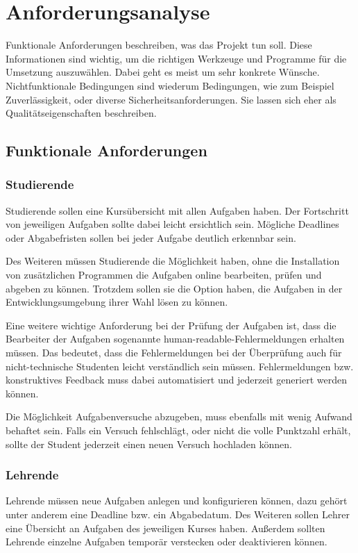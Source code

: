 \section{Anforderungsanalyse}\label{anforderungsanalyse}
Funktionale Anforderungen beschreiben, was das Projekt tun soll. Diese
Informationen sind wichtig, um die richtigen Werkzeuge und Programme für die
Umsetzung auszuwählen. Dabei geht es meist um sehr konkrete Wünsche.
Nichtfunktionale Bedingungen sind wiederum Bedingungen, wie zum Beispiel
Zuverlässigkeit, oder diverse Sicherheitsanforderungen. Sie lassen sich eher als
Qualitätseigenschaften beschreiben.

\subsection{Funktionale Anforderungen}\label{anforderungsanalyse-funktional}
\subsubsection{Studierende}\label{anforderungsanalyse-funktional-stud}
Studierende sollen eine Kursübersicht mit allen Aufgaben haben. Der Fortschritt
von jeweiligen Aufgaben sollte dabei leicht ersichtlich sein. Mögliche Deadlines
oder Abgabefristen sollen bei jeder Aufgabe deutlich erkennbar sein.

Des Weiteren müssen Studierende die Möglichkeit haben, ohne die Installation von zusätzlichen Programmen die Aufgaben online bearbeiten, prüfen und abgeben
zu können. Trotzdem sollen sie die Option haben, die Aufgaben in der Entwicklungsumgebung ihrer Wahl lösen zu können.

Eine weitere wichtige Anforderung bei der Prüfung der Aufgaben ist, dass
die Bearbeiter der Aufgaben sogenannte
\glqq human-readable\grqq{}-Fehlermeldungen erhalten müssen. Das bedeutet, dass
die Fehlermeldungen bei der Überprüfung auch für nicht-technische Studenten
leicht verständlich sein müssen. Fehlermeldungen bzw. konstruktives Feedback
muss dabei automatisiert und jederzeit generiert werden können.

Die Möglichkeit Aufgabenversuche abzugeben, muss ebenfalls mit wenig Aufwand
behaftet sein. Falls ein Versuch fehlschlägt, oder nicht die volle Punktzahl
erhält, sollte der Student jederzeit einen neuen Versuch hochladen können.

\subsubsection{Lehrende}\label{anforderungsanalyse-funktional-lehrende}
Lehrende müssen neue Aufgaben anlegen und konfigurieren können, dazu gehört
unter anderem eine Deadline bzw. ein Abgabedatum. Des Weiteren sollen Lehrer
eine Übersicht an Aufgaben des jeweiligen Kurses haben. Außerdem sollten
Lehrende einzelne Aufgaben temporär verstecken oder deaktivieren können.


